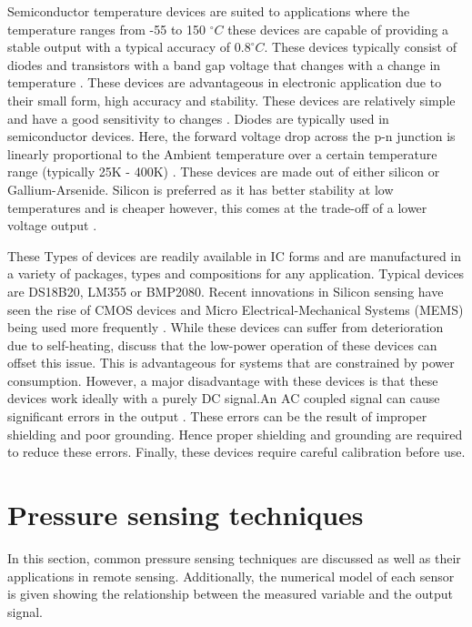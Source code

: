 Semiconductor temperature devices are suited to applications where the temperature ranges from -55 to 150 $^\circ C$ these devices are capable of providing a stable output with a typical accuracy of $0.8 ^\circ C$. These devices typically consist of diodes and transistors with a band gap voltage that changes with a change in temperature \cite{childs2000review}. These devices are advantageous in electronic application due to their small form, high accuracy and stability. These devices are relatively simple and have a good sensitivity to changes \cite{childs2000review}. Diodes are typically used in semiconductor devices. Here, the forward voltage drop across the p-n junction is linearly proportional to the Ambient temperature over a certain temperature range (typically 25K - 400K) \cite{childs2000review}. These devices are made out of either silicon or Gallium-Arsenide. Silicon is preferred as it has better stability at low temperatures and is cheaper however, this comes at the trade-off of a lower voltage output \cite{childs2000review}. \par These Types of devices are readily available in IC forms and are manufactured in a variety of packages, types and compositions for any application. Typical devices are DS18B20, LM355 or BMP2080. Recent innovations in Silicon sensing have seen the rise of CMOS devices and Micro Electrical-Mechanical Systems (MEMS) being used more frequently \cite{mansoor2015silicon}. While these devices can suffer from deterioration due to self-heating, \textcite{mansoor2015silicon} discuss that the low-power operation of these devices can offset this issue. This is advantageous for systems that are constrained by power consumption. However, a major disadvantage with these devices is that these devices work ideally with a purely DC signal.An AC coupled signal can cause significant errors in the output \cite{childs2000review} \cite{mansoor2015silicon}. These errors can be the result of improper shielding and poor grounding. Hence proper shielding and grounding are required to reduce these errors. Finally, these devices require careful calibration before use.

\section{Pressure sensing techniques}

In this section, common pressure sensing techniques are discussed as well as their applications in remote sensing. Additionally, the numerical model of each sensor is given showing the relationship between the measured variable and the output signal. 

